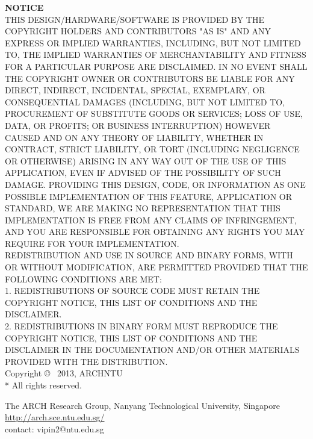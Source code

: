 \documentclass[letterpaper,oneside,10pt,extrafontsizes]{memoir}
\begin{document}
\frontmatter
\pagestyle{empty}

\clearpage

{\begingroup
\parbox[b]{\textwidth}{
\hspace*{0.4\textwidth}
{\noindent\LARGE\bfseries {\color{red}NOTICE}} \\[2\baselineskip]
THIS DESIGN/HARDWARE/SOFTWARE IS PROVIDED BY THE COPYRIGHT HOLDERS AND CONTRIBUTORS "AS IS" AND
ANY EXPRESS OR IMPLIED WARRANTIES, INCLUDING, BUT NOT LIMITED TO, THE IMPLIED
WARRANTIES OF MERCHANTABILITY AND FITNESS FOR A PARTICULAR PURPOSE ARE
DISCLAIMED. IN NO EVENT SHALL THE COPYRIGHT OWNER OR CONTRIBUTORS BE LIABLE FOR
ANY DIRECT, INDIRECT, INCIDENTAL, SPECIAL, EXEMPLARY, OR CONSEQUENTIAL DAMAGES
(INCLUDING, BUT NOT LIMITED TO, PROCUREMENT OF SUBSTITUTE GOODS OR SERVICES;
LOSS OF USE, DATA, OR PROFITS; OR BUSINESS INTERRUPTION) HOWEVER CAUSED AND
ON ANY THEORY OF LIABILITY, WHETHER IN CONTRACT, STRICT LIABILITY, OR TORT
(INCLUDING NEGLIGENCE OR OTHERWISE) ARISING IN ANY WAY OUT OF THE USE OF THIS
APPLICATION, EVEN IF ADVISED OF THE POSSIBILITY OF SUCH DAMAGE.
PROVIDING THIS DESIGN, CODE, OR INFORMATION AS ONE POSSIBLE IMPLEMENTATION OF THIS FEATURE, 
APPLICATION OR STANDARD, WE ARE MAKING NO REPRESENTATION THAT THIS IMPLEMENTATION IS FREE FROM ANY
CLAIMS OF INFRINGEMENT, AND YOU ARE RESPONSIBLE FOR OBTAINING ANY
RIGHTS YOU MAY REQUIRE FOR YOUR IMPLEMENTATION.\\

REDISTRIBUTION AND USE IN SOURCE AND BINARY FORMS, WITH OR WITHOUT
MODIFICATION, ARE PERMITTED PROVIDED THAT THE FOLLOWING CONDITIONS ARE MET:\\ 
1. REDISTRIBUTIONS OF SOURCE CODE MUST RETAIN THE COPYRIGHT NOTICE, THIS
   LIST OF CONDITIONS AND THE DISCLAIMER.\\ 
2. REDISTRIBUTIONS IN BINARY FORM MUST REPRODUCE THE COPYRIGHT NOTICE,
   THIS LIST OF CONDITIONS AND THE DISCLAIMER IN THE DOCUMENTATION
   AND/OR OTHER MATERIALS PROVIDED WITH THE DISTRIBUTION.\\[2\baselineskip]   

Copyright \copyright~ 2013, ARCHNTU\\
* All rights reserved.
 
{\noindent The ARCH Research Group, Nanyang Technological University, Singapore\\
\url{http://arch.sce.ntu.edu.sg/}\\
contact: vipin2@ntu.edu.sg
}\\[\baselineskip] 
}
\endgroup}
\clearpage

\pagestyle{headings}
\tableofcontents*
\setlength{\unitlength}{1pt}
\clearpage
\listoffigures*
\clearpage
\listoftables*
\clearpage


\mainmatter

\pagestyle{companion}







\end{document}
